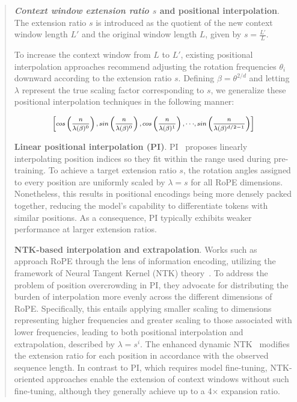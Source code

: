 \begin{abstract}
\textbf{\emph{Context window extension ratio $s$} and positional interpolation}. The extension ratio $s$ is introduced as the quotient of the new context window length $L'$ and the original window length $L$, given by $s=\frac{L'}{L}$.

To increase the context window from $L$ to $L'$, existing positional interpolation approaches recommend adjusting the rotation frequencies $\theta_i$ downward according to the extension ratio $s$. Defining $\beta=\theta^{2/d}$ and letting $\lambda$ represent the true scaling factor corresponding to $s$, we generalize these positional interpolation techniques in the following manner:

\begin{equation}	
	\fontsize{7.5}{7.5} \selectfont
	\label{eq:unified_rope}
	\begin{aligned}
		\left[cos\left(\frac{n}{\lambda(\beta)^0}\right), sin \left(\frac{n}{\lambda(\beta)^0}\right), cos\left(\frac{n}{\lambda(\beta)^1}\right), \cdot\cdot\cdot,  sin \left(\frac{n}{\lambda(\beta)^{d/2-1}}\right) \right]   
	\end{aligned}
\end{equation}

\textbf{Linear positional interpolation (PI)}. PI~\cite{pi} proposes linearly interpolating position indices so they fit within the range used during pre-training. To achieve a target extension ratio $s$, the rotation angles assigned to every position are uniformly scaled by $\lambda=s$ for all RoPE dimensions. Nonetheless, this results in positional encodings being more densely packed together, reducing the model's capability to differentiate tokens with similar positions. As a consequence, PI typically exhibits weaker performance at larger extension ratios.

\textbf{NTK-based interpolation and extrapolation}. Works such as~\cite{ntk,dynamicntk} approach RoPE through the lens of information encoding, utilizing the framework of Neural Tangent Kernel (NTK) theory~\cite{jacot2018neural,tancik2020fourier}. To address the problem of position overcrowding in PI, they advocate for distributing the burden of interpolation more evenly across the different dimensions of RoPE. Specifically, this entails applying smaller scaling to dimensions representing higher frequencies and greater scaling to those associated with lower frequencies, leading to both positional interpolation and extrapolation, described by $\lambda=s^{i}$. The enhanced dynamic NTK~\cite{dynamicntk} modifies the extension ratio for each position in accordance with the observed sequence length. In contrast to PI, which requires model fine-tuning, NTK-oriented approaches enable the extension of context windows without such fine-tuning, although they generally achieve up to a 4$\times$ expansion ratio.


\end{abstract}
